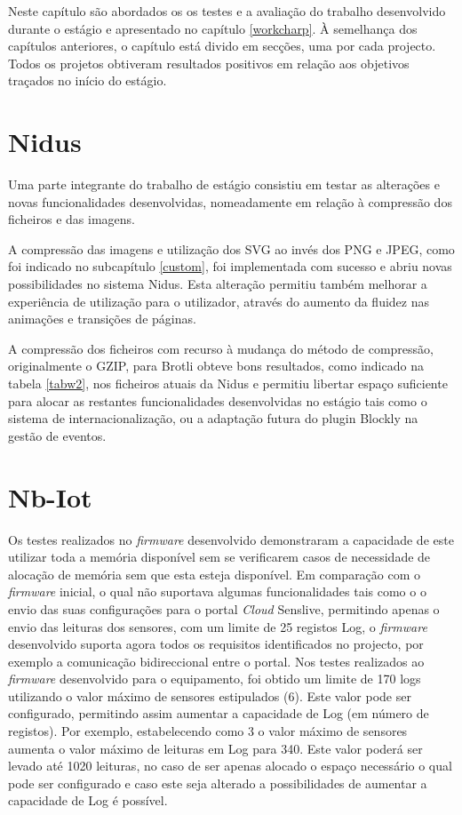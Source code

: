 \par Neste capítulo são abordados os os testes e a avaliação do trabalho desenvolvido durante o estágio e apresentado no capítulo \ref{workcharp}. À semelhança dos capítulos anteriores, o capítulo está divido em secções, uma por cada projecto. Todos os projetos obtiveram resultados positivos em relação aos objetivos traçados no início do estágio.

\section{Nidus}

\par Uma parte integrante do trabalho de estágio consistiu em testar as alterações e novas funcionalidades desenvolvidas, nomeadamente em relação à compressão dos ficheiros e das imagens. 
\par A compressão das imagens e utilização dos SVG ao invés dos PNG e JPEG, como foi indicado no subcapítulo \ref{custom}, foi implementada com sucesso e abriu novas possibilidades  no sistema Nidus. Esta alteração permitiu também melhorar a experiência de utilização para o utilizador, através do aumento da fluidez nas animações e transições de páginas.
\par A compressão dos ficheiros com recurso à mudança do método de compressão, originalmente o GZIP, para Brotli obteve bons resultados, como indicado na tabela \ref{tabw2}, nos ficheiros atuais da Nidus e permitiu libertar espaço suficiente para alocar as restantes funcionalidades desenvolvidas no estágio tais como o sistema de internacionalização, ou a adaptação futura do plugin Blockly na gestão de eventos.

\section{Nb-Iot}

\par Os testes realizados no \textit{firmware} desenvolvido demonstraram a capacidade de este utilizar toda a memória disponível sem se verificarem casos de necessidade de alocação de memória sem que esta esteja disponível. Em comparação com o \textit{firmware} inicial, o qual não suportava algumas funcionalidades tais como o o envio das suas configurações para o portal \textit{Cloud} Senslive, permitindo apenas o envio das leituras dos sensores, com um limite de 25 registos Log, o \textit{firmware} desenvolvido suporta agora todos os requisitos identificados no projecto, por exemplo a comunicação bidireccional entre o portal. Nos testes realizados ao \textit{firmware} desenvolvido para o equipamento, foi obtido um limite de 170 logs utilizando o valor máximo de sensores estipulados (6). Este valor pode ser configurado, permitindo assim aumentar a capacidade de Log (em número de registos). Por exemplo, estabelecendo como 3 o valor máximo de sensores aumenta o valor máximo de leituras em Log para 340. Este valor poderá ser levado até 1020 leituras, no caso de ser apenas alocado o espaço necessário o qual pode ser configurado e caso este seja alterado a possibilidades de aumentar a capacidade de Log é possível.


